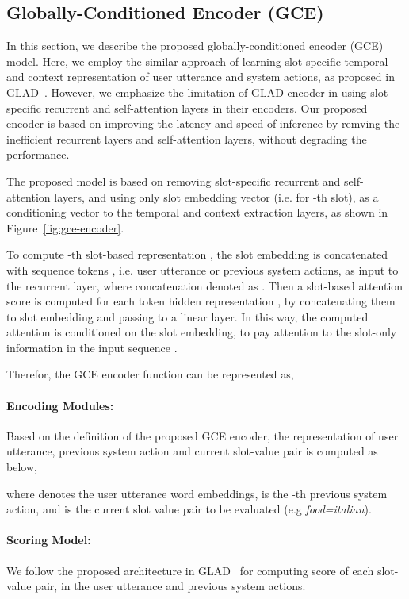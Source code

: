\documentclass{article}
\begin{document}
\subsection{Globally-Conditioned Encoder (GCE)}
\label{seq:proposed}
In this section, we describe the proposed globally-conditioned encoder (GCE) model. Here, we employ the similar approach of learning slot-specific temporal and context representation of user utterance and system actions, as proposed in GLAD~\citep{Zhong2018GlobalLocallySD}. However, we emphasize the limitation of GLAD encoder in using slot-specific recurrent and self-attention layers in their encoders. Our proposed encoder is based on improving the latency and speed of inference by remving the inefficient recurrent layers and self-attention layers, without degrading the performance. 

The proposed model is based on removing slot-specific recurrent and self-attention layers, and using only slot embedding vector (i.e.  for -th slot), as a conditioning vector to the temporal and context extraction layers, as shown in Figure~\ref{fig:gce-encoder}.   




To compute -th slot-based representation , the slot embedding  is concatenated with sequence tokens , i.e. user utterance or previous system actions, as input to the recurrent layer, where concatenation denoted as . 
Then a slot-based attention score  is computed for each token hidden representation , by concatenating them to slot embedding  and passing to a linear layer. In this way, the computed attention is conditioned on the slot embedding, to pay attention to the slot-only information in the input sequence .

Therefor, the GCE encoder function can be represented as,




\paragraph{Encoding Modules:} Based on the definition of the proposed GCE encoder, the representation of user utterance, previous system action and current slot-value pair is computed as below, 



where  denotes the user utterance word embeddings,  is the -th previous system action, and  is the current slot value pair to be evaluated (e.g \textit{food=italian}).


\paragraph{Scoring Model:} We follow the proposed architecture in GLAD~\citep{Zhong2018GlobalLocallySD} for computing score of each slot-value pair, in the user utterance and previous system actions.
\end{document}
